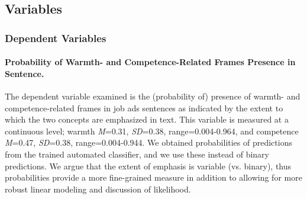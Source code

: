 \documentclass[man]{apa7}
\begin{document}
\subsection{Variables}
\label{variables}

\subsubsection{Dependent Variables}
\label{dvs}
\paragraph{Probability of Warmth- and Competence-Related Frames Presence in Sentence.}
\label{dvs_prob}
The dependent variable examined is the (probability of) presence of warmth- and competence-related frames in job ads sentences as indicated by the extent to which the two concepts are emphasized in text. This variable is measured at a continuous level; warmth \textit{M}=0.31, \textit{SD}=0.38, range=0.004-0.964, and competence \textit{M}=0.47, \textit{SD}=0.38, range=0.004-0.944. We obtained probabilities of predictions from the trained automated classifier, and we use these instead of binary predictions. We argue that the extent of emphasis is variable (vs. binary), thus probabilities provide a more fine-grained measure in addition to allowing for more robust linear modeling and discussion of likelihood.
\end{document}
